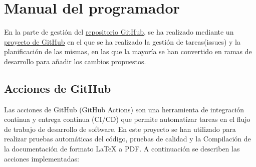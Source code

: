 \section{Manual del programador}
\label{sec:manual-programador}

En la parte de gestión del \href{https://github.com/CesarRodrigu/GII-24.19-contramedidas-IoT-mediante-reinforcement-learning}{repositorio GitHub}, se ha realizado mediante un \href{https://github.com/users/CesarRodrigu/projects/6}{proyecto de GitHub} en el que se ha realizado la gestión de tareas(issues) y la planificación de las mismas, en las que la mayoría se han convertido en ramas de desarrollo para añadir los cambios propuestos.

\subsection{Acciones de GitHub}
\label{subsec:acciones}
Las acciones de GitHub (GitHub Actions) son una herramienta de integración continua y entrega continua (CI/CD) que permite automatizar tareas en el flujo de trabajo de desarrollo de software. En este proyecto se han utilizado para realizar pruebas automáticas del código, pruebas de calidad y la Compilación de la documentación de formato LaTeX a PDF. A continuación se describen las acciones implementadas:
